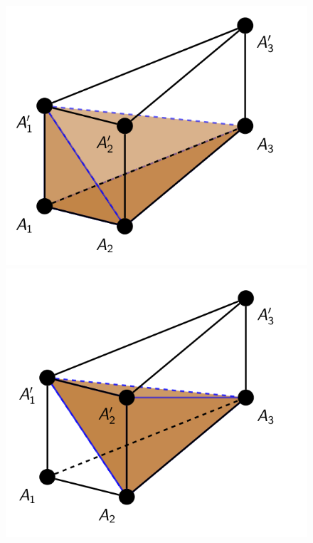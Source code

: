 \documentclass[12pt]{article}
\begin{document}
\begin{figure}[h]
\begin{minipage}{0.3\textwidth}
\centering
\includegraphics[width = 1.0\textwidth]{first_tetra_prism.png}
\end{minipage}
\hfill
\begin{minipage}{0.3\textwidth}
\centering
\includegraphics[width = 1.0\textwidth]{second_tetra_prism.png}
\end{minipage}

\end{figure}
\end{document}
